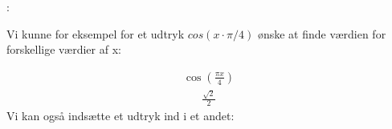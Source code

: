 \documentclass[letterpaper,10pt,english]{jupyterBook}
\begin{document}
:

Vi kunne for eksempel for et udtryk \(cos(x \cdot \pi / 4)\) ønske at finde værdien for forskellige værdier af x:

\begin{sphinxVerbatim}[commandchars=\\\{\}]
      

 
\end{sphinxVerbatim}
\begin{equation*}
\begin{split}\displaystyle \cos{\left(\frac{\pi x}{4} \right)}\end{split}
\end{equation*}\begin{equation*}
\begin{split}\displaystyle \frac{\sqrt{2}}{2}\end{split}
\end{equation*}
Vi kan også indsætte et udtryk ind i et andet:
\end{document}
